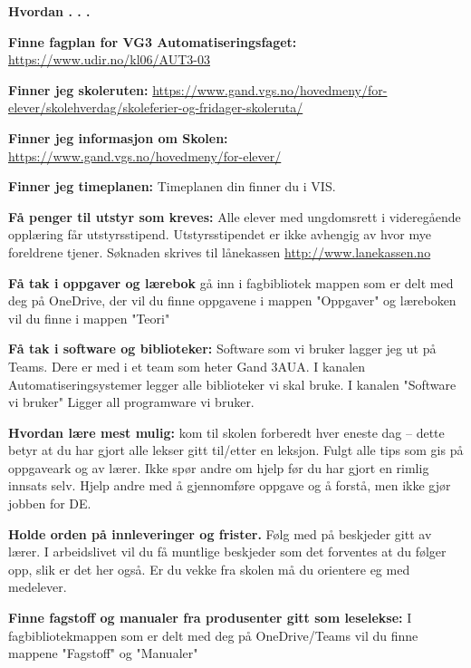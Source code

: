 \documentclass[12pt,a4paper]{book}
\begin{document}

\centerline{\bf Hvordan . . .} \bigskip 

\noindent
{\bf Finne fagplan for VG3 Automatiseringsfaget:} \url{https://www.udir.no/kl06/AUT3-03}
\vskip 10pt

\noindent
{\bf Finner jeg skoleruten:} \url{https://www.gand.vgs.no/hovedmeny/for-elever/skolehverdag/skoleferier-og-fridager-skoleruta/}
\vskip 10pt

\noindent
{\bf Finner jeg informasjon om Skolen:} \url{https://www.gand.vgs.no/hovedmeny/for-elever/}
\vskip 10pt

\noindent
{\bf Finner jeg timeplanen:} Timeplanen din finner du i VIS. 
\vskip 10pt

\noindent
{\bf Få penger til utstyr som kreves:} Alle elever med ungdomsrett i videregående opplæring får utstyrsstipend. Utstyrsstipendet er ikke avhengig av hvor mye foreldrene tjener.
Søknaden skrives til lånekassen \url{http://www.lanekassen.no}
\vskip 10pt

\noindent
{\bf Få tak i oppgaver og lærebok} gå inn i fagbibliotek mappen som er delt med deg på OneDrive, der vil du finne oppgavene i mappen "Oppgaver" og læreboken vil du finne i mappen "Teori" 
\vskip 10pt

\noindent
{\bf Få tak i  software og biblioteker:} Software som vi bruker lagger jeg ut på Teams. Dere er med i et team som heter Gand 3AUA. I kanalen Automatiseringsystemer legger alle biblioteker vi skal bruke. I kanalen "Software vi bruker" Ligger all programware vi bruker. 
\vskip 10pt

\noindent
{\bf Hvordan lære mest mulig:} kom til skolen forberedt hver eneste dag -- dette betyr at du har gjort alle lekser gitt til/etter en leksjon. Fulgt alle tips som gis på oppgaveark og av lærer. Ikke spør andre om hjelp før du har gjort en rimlig innsats selv. Hjelp andre med å gjennomføre oppgave og å forstå, men ikke gjør jobben for DE. 
\vskip 10pt

\noindent
{\bf Holde orden på innleveringer og frister.} Følg med på beskjeder gitt av lærer. I arbeidslivet vil du få muntlige beskjeder som det forventes at du følger opp, slik er det her også. Er du vekke fra skolen må du orientere eg med medelever. 
\vskip 10pt


\noindent
{\bf Finne fagstoff og manualer fra produsenter gitt som leselekse:} I fagbibliotekmappen som er delt med deg på OneDrive/Teams vil du finne mappene "Fagstoff" og  "Manualer" 
\vskip 10pt
\end{document}
